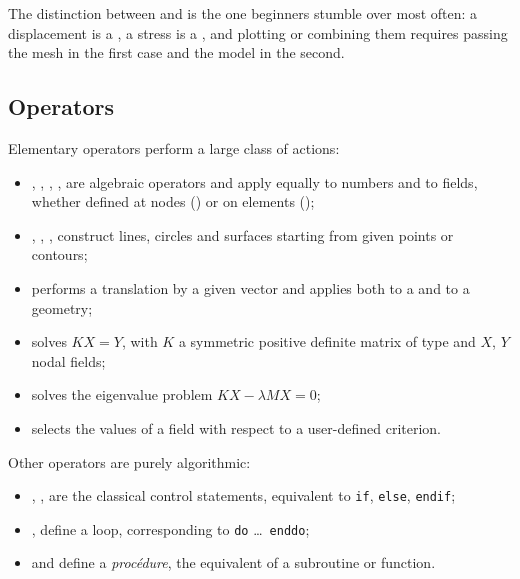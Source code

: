 \noindent The distinction between  and  is the one
beginners stumble over most often: a displacement is a , a stress
is a , and plotting or combining them requires passing the mesh in
the first case and the model in the second.

\subsection*{Operators}

Elementary operators perform a large class of actions:

\begin{itemize}
\item \op{+}, \op{*}, \op{/}, \op{-}, \op{**} are algebraic operators and
  apply equally to numbers and to fields, whether defined at nodes
  () or on elements ();
\item {} , 
  ,  ,
    construct lines, circles and
  surfaces starting from given points or contours;
\item {}  performs a translation by a given vector and
  applies both to a  and to a geometry;
\item {}  solves $KX=Y$, with $K$ a
  symmetric positive definite matrix of  type and $X$, $Y$ nodal
  fields;
\item {}  solves the eigenvalue problem
  $KX-\lambda MX=0$;
\item {}  selects
  the values of a field with respect to a user-defined criterion.
\end{itemize}

\noindent Other operators are purely algorithmic:

\begin{itemize}
\item {} ,  , 
   are the classical control statements, equivalent to
  \texttt{if}, \texttt{else}, \texttt{endif};
\item {} , 
   define a loop, corresponding to \texttt{do} \ldots\
  \texttt{enddo};
\item {}  and
  \op{finp[roc]} \dindex{finp[roc]}{subroutine, end} define a
  \emph{procédure}, the equivalent of a subroutine or function.
\end{itemize}

